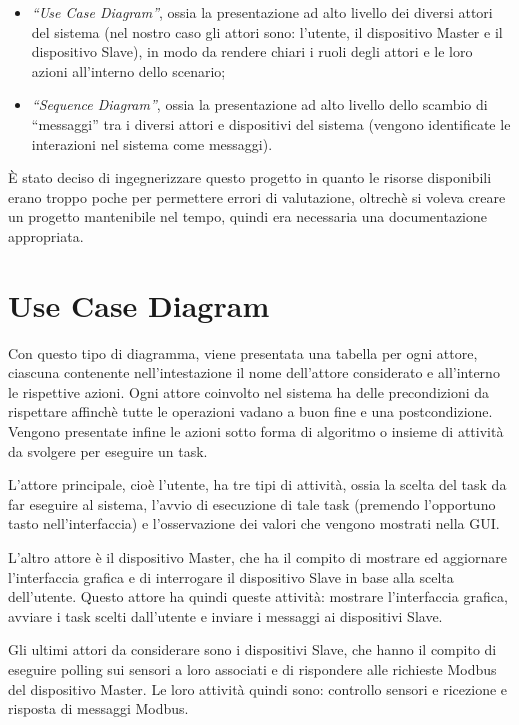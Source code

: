 \documentclass[a4paper,titlepage]{book}
\newcommand{\itema}{\begin{itemize}[noitemsep,topsep=10pt,parsep=5pt,partopsep=10pt]}
\begin{document}
\itema 

\item\textit{``Use Case Diagram''}, ossia la presentazione ad alto livello dei diversi attori del sistema (nel nostro caso gli attori sono: l'utente, il dispositivo Master e il dispositivo Slave), in modo da rendere chiari i ruoli degli attori e le loro azioni all'interno dello scenario;
\item\textit{``Sequence Diagram''}, ossia la presentazione ad alto livello dello scambio di ``messaggi'' tra i diversi attori e dispositivi del sistema (vengono identificate le interazioni nel sistema come messaggi).

\end{itemize}

È stato deciso di ingegnerizzare questo progetto in quanto le risorse disponibili erano troppo poche per permettere errori di valutazione, oltrechè si voleva creare un progetto mantenibile nel tempo, quindi era necessaria una documentazione appropriata.

\section{Use Case Diagram}

Con questo tipo di diagramma, viene presentata una tabella per ogni attore, ciascuna contenente nell'intestazione il nome dell'attore considerato e all'interno le rispettive azioni. Ogni attore coinvolto nel sistema ha delle precondizioni da rispettare affinchè tutte le operazioni vadano a buon fine e una postcondizione. Vengono presentate infine le azioni sotto forma di algoritmo o insieme di attività da svolgere per eseguire un task.

L'attore principale, cioè l'utente, ha tre tipi di attività, ossia la scelta del task da far eseguire al sistema, l'avvio di esecuzione di tale task (premendo l'opportuno tasto nell'interfaccia) e l'osservazione dei valori che vengono mostrati nella GUI.

L'altro attore è il dispositivo Master, che ha il compito di mostrare ed aggiornare l'interfaccia grafica e di interrogare il dispositivo Slave in base alla scelta dell'utente. Questo attore ha quindi queste attività: mostrare l'interfaccia grafica, avviare i task scelti dall'utente e inviare i messaggi ai dispositivi Slave.

Gli ultimi attori da considerare sono i dispositivi Slave, che hanno il compito di eseguire polling sui sensori a loro associati e di rispondere alle richieste Modbus del dispositivo Master. Le loro attività quindi sono: controllo sensori e ricezione e risposta di messaggi Modbus.
\end{document}

